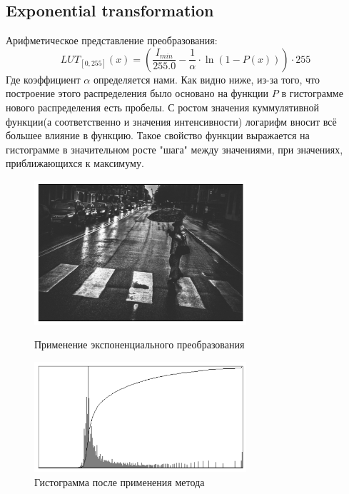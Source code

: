 \documentclass[a4paper,12pt]{article}
\begin{document}
\subsection{Exponential transformation}
Арифметическое представление преобразования:
$$LUT_{[0,255]}(x) = \left( \dfrac{I_{min}}{255.0} - \dfrac{1}{\alpha} \cdot \ln\left(1-P(x)\right) \right) \cdot 255$$
Где коэффициент $\alpha$ определяется нами. 
Как видно ниже, из-за того, что построение этого распределения было основано на функции $P$ в гистограмме нового распределения есть пробелы. 
С ростом значения куммулятивной функции(а соответственно и значения интенсивности) логарифм вносит всё большее влияние в функцию. Такое свойство функции выражается на гистограмме в значительном росте "шага" между значениями, при значениях, приближающихся к максимуму.
\begin{figure}[H]
    \centering \includegraphics[width=0.7\textwidth]{images/exp.png}
    \caption{Применение экспоненциального преобразования}
    \centering \includegraphics[width=0.7\textwidth]{images/exp_hist.png}
    \caption{Гистограмма после применения метода}
\end{figure}
\end{document}

